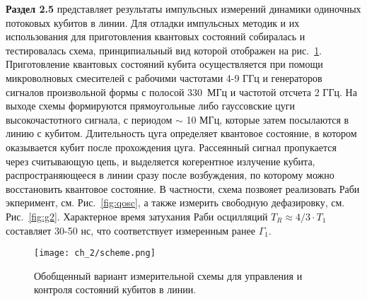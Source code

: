 \textbf{Раздел 2.5} представляет результаты импульсных измерений динамики одиночных потоковых кубитов в линии. Для отладки импульсных методик и их использования для приготовления квантовых состояний собиралась и тестировалась схема, принципиальный вид которой отображен на рис.~\ref{fig: time_domain}. Приготовление квантовых состояний кубита осуществляется при помощи микроволновых смесителей с рабочими частотами 4-9 ГГц и генераторов сигналов произвольной формы с полосой $330$~МГц и частотой отсчета 2 ГГц. На выходе схемы формируются прямоугольные либо гауссовские цуги высокочастотного сигнала, с периодом $\sim$ 10 МГц, которые затем посылаются в линию с кубитом. Длительность цуга определяет квантовое состояние, в котором оказывается кубит после прохождения цуга. Рассеянный сигнал пропукается через считывающую цепь, и выделяется когерентное излучение кубита, распространяющееся в линии сразу после возбуждения, по которому можно восстановить квантовое состояние. В частности, схема позвояет реализовать Раби экперимент, см. Рис.~\ref{fig:qosc}, а также измерить свободную дефазировку, см. Рис.~\ref{fig:g2}. Характерное время затухания Раби осцилляций  $T_R \approx 4/3\cdot T_1$ составляет 30-50 нс, что соответствует измеренным ранее $\Gamma_1$. 

\begin{figure}[htb]\center
	\texttt{[image: ch\_2/scheme.png]} \hfill
	\caption[width=0.6\textwidth]{Обобщенный вариант измерительной схемы для управления и контроля состояний кубитов в линии.}
	\label{fig: time_domain}
\end{figure}


